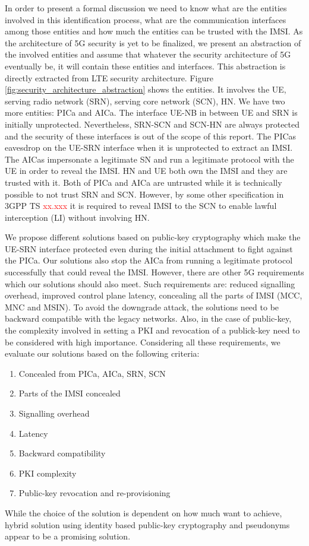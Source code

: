 \documentclass[lnicst,sechang,a4paper]{svmultln}
\begin{document}
In order to present a formal discussion we need to know what are the entities involved in this identification process, what are the communication interfaces among those entities and how much the entities can be trusted with the IMSI.  As the architecture of 5G security is yet to be finalized, we present an abstraction of the involved entities and assume that whatever the security architecture of 5G eventually be, it will contain these entities and interfaces. This abstraction is directly extracted from LTE security architecture. Figure \ref{fig:security_architecture_abstraction} shows the entities. It involves the UE, serving radio network (SRN), serving core network (SCN), HN. We have two more entities: PICa and AICa. The interface  UE-NB in between UE and SRN is initially unprotected. Nevertheless, SRN-SCN and SCN-HN are always protected and the security of these interfaces is out of the scope of this report. The PICas eavesdrop on the UE-SRN interface when it is unprotected to extract an IMSI. The AICas impersonate a legitimate SN and run a legitimate protocol with the UE in order to reveal the IMSI. HN and UE both own the IMSI and they are trusted with it. Both of PICa and AICa are untrusted while it is technically possible to not trust SRN and SCN. However, by some other specification in 3GPP TS \textcolor{red}{xx.xxx} it is required to reveal IMSI to the SCN to enable lawful interception (LI) without involving HN. 

We propose different solutions based on public-key cryptography which make the UE-SRN interface protected even during the initial attachment to fight against the PICa. Our solutions also stop the AICa from running a legitimate protocol successfully that could reveal the IMSI. However, there are other 5G requirements which our solutions should also meet. Such requirements are: reduced signalling overhead, improved control plane latency, concealing all the parts of IMSI (MCC, MNC and MSIN). To avoid the downgrade attack, the solutions need to be backward compatible with the legacy networks. Also, in the case of public-key, the complexity involved in setting a PKI and revocation of a publick-key need to be considered with high importance. Considering all these requirements, we evaluate our solutions based on the following criteria:
\begin{enumerate}
\item Concealed from PICa, AICa, SRN, SCN
\item Parts of the IMSI concealed
\item Signalling overhead
\item Latency
\item Backward compatibility
\item PKI complexity
\item Public-key revocation and re-provisioning 
\end{enumerate}
While the choice of the solution is dependent on how much want to achieve, hybrid solution using identity based public-key cryptography and pseudonyms appear to be a promising solution.
\end{document}
